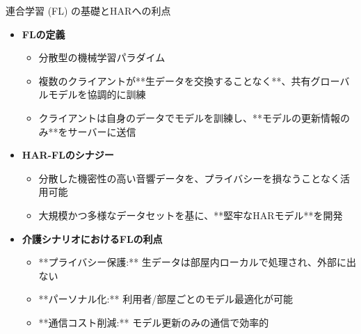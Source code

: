 \documentclass[unicode,12pt,aspectratio=169,dvipdfmx]{beamer}
\begin{document}
\begin{frame}{連合学習 (FL) の基礎とHARへの利点}
\begin{itemize}
    \item \textbf{FLの定義}
    \begin{itemize}
        \item 分散型の機械学習パラダイム
        \item 複数のクライアントが**生データを交換することなく**、共有グローバルモデルを協調的に訓練
        \item クライアントは自身のデータでモデルを訓練し、**モデルの更新情報のみ**をサーバーに送信
    \end{itemize}
    \item \textbf{HAR-FLのシナジー}
    \begin{itemize}
        \item 分散した機密性の高い音響データを、プライバシーを損なうことなく活用可能
        \item 大規模かつ多様なデータセットを基に、**堅牢なHARモデル**を開発
    \end{itemize}
    \item \textbf{介護シナリオにおけるFLの利点}
    \begin{itemize}
        \item **プライバシー保護:** 生データは部屋内ローカルで処理され、外部に出ない
        \item **パーソナル化:** 利用者/部屋ごとのモデル最適化が可能
        \item **通信コスト削減:** モデル更新のみの通信で効率的
    \end{itemize}
\end{itemize}
\end{frame}

\end{document}

